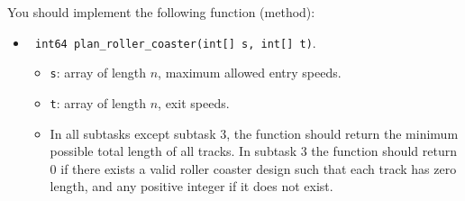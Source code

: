 You should implement the following function (method):
\begin{itemize}
\item \texttt{ int64 plan\_roller\_coaster(int[] s, int[] t)}. 
\begin{itemize}
	\item \texttt{s}: array of length $n$, maximum allowed entry speeds.
	\item \texttt{t}: array of length $n$, exit speeds.
	\item In all subtasks except subtask 3, the function should return the minimum possible total length of all tracks. In subtask 3 the function should return $0$ if there exists a valid roller coaster design such that each track has zero length, and any positive integer if it does not exist.
\end{itemize}
\end{itemize}

